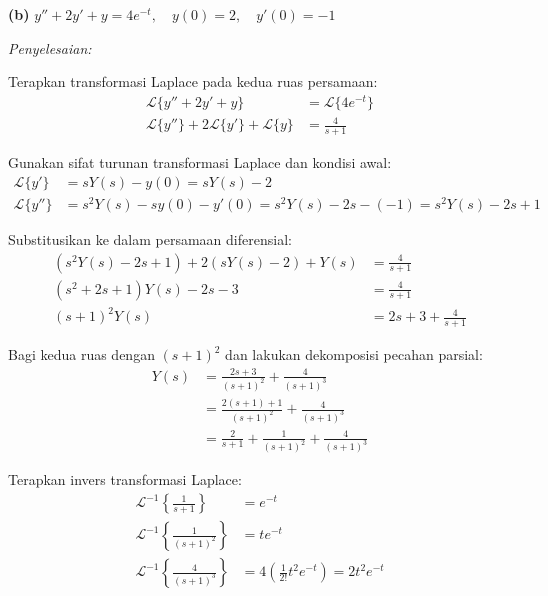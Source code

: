 \documentclass[11pt,a4paper]{article}
\begin{document}
\vspace{16pt}

\setcounter{equation}{0}
\noindent \textbf{(b)} $y'' + 2y' + y = 4e^{-t}, \quad y(0) = 2, \quad y'(0) = -1$

\vspace{2pt}
\noindent \textit{Penyelesaian:}

Terapkan transformasi Laplace pada kedua ruas persamaan:
\begin{align*}
    \mathcal{L}\{y'' + 2y' + y\} &= \mathcal{L}\{4e^{-t}\} \\
    \mathcal{L}\{y''\} + 2\mathcal{L}\{y'\} + \mathcal{L}\{y\} &= \frac{4}{s + 1}
\end{align*}

Gunakan sifat turunan transformasi Laplace dan kondisi awal:
\begin{align*}
    \mathcal{L}\{y'\} &= sY(s) - y(0) = sY(s) - 2 \\
    \mathcal{L}\{y''\} &= s^2Y(s) - sy(0) - y'(0) = s^2Y(s) - 2s - (-1) = s^2Y(s) - 2s + 1
\end{align*}

Substitusikan ke dalam persamaan diferensial:
\begin{align*}
    (s^2Y(s) - 2s + 1) + 2(sY(s) - 2) + Y(s) &= \frac{4}{s + 1} \\
    (s^2 + 2s + 1)Y(s) - 2s - 3 &= \frac{4}{s + 1} \\
    (s + 1)^2 Y(s) &= 2s + 3 + \frac{4}{s + 1}
\end{align*}

Bagi kedua ruas dengan $(s + 1)^2$ dan lakukan dekomposisi pecahan parsial:
\begin{align*}
    Y(s) &= \frac{2s + 3}{(s + 1)^2} + \frac{4}{(s + 1)^3} \\
    &= \frac{2(s + 1) + 1}{(s + 1)^2} + \frac{4}{(s + 1)^3} \\
    &= \frac{2}{s + 1} + \frac{1}{(s + 1)^2} + \frac{4}{(s + 1)^3}
\end{align*}

Terapkan invers transformasi Laplace:
\begin{align*}
    \mathcal{L}^{-1}\left\{\frac{1}{s + 1}\right\} &= e^{-t} \\
    \mathcal{L}^{-1}\left\{\frac{1}{(s + 1)^2}\right\} &= t e^{-t} \\
    \mathcal{L}^{-1}\left\{\frac{4}{(s + 1)^3}\right\} &= 4 \left(\frac{1}{2!}t^2 e^{-t}\right) = 2t^2 e^{-t}
\end{align*}
\end{document}

